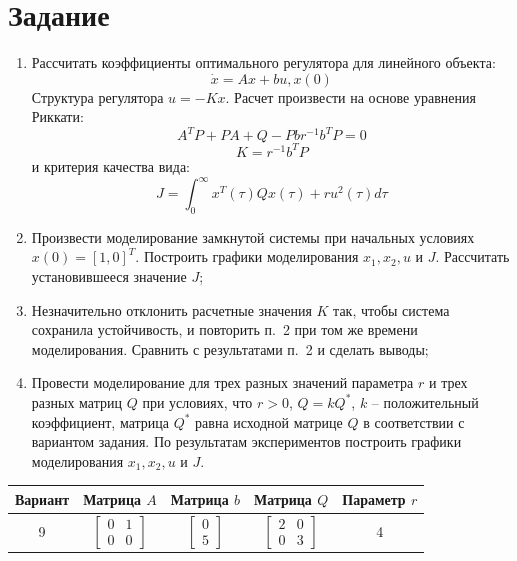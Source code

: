 \documentclass[14pt, a4paper]{extarticle}
\begin{document}
	\onehalfspacing
	
	\setcounter{page}{2}
	
	\section*{Задание}
	
	\begin{enumerate}
		\item Рассчитать коэффициенты оптимального регулятора для линейного объекта:
		$$\dot{x}=Ax+bu, x(0)$$
		Структура регулятора $u=-Kx$. Расчет произвести на основе уравнения Риккати:
		$$A^TP+PA+Q-Pbr^{-1}b^TP=0$$
		$$K=r^{-1}b^TP$$
		и критерия качества вида:
		$$J=\int_{0}^{\infty}x^T(\tau)Qx(\tau)+ru^2(\tau)d\tau$$
		\item Произвести моделирование замкнутой системы при начальных условиях $x(0)=[1,0]^T$. Построить графики моделирования $x_1,x_2,u$ и $J$. Рассчитать установившееся значение $J$;
		\item Незначительно отклонить расчетные значения $K$ так, чтобы система сохранила устойчивость, и повторить п.~2 при том же времени моделирования. Сравнить с результатами п.~2 и сделать выводы;
		\item Провести моделирование для трех разных значений параметра $r$ и трех разных матриц $Q$ при условиях, что $r>0$, $Q=kQ^*$, $k$ -- положительный коэффициент, матрица $Q^*$ равна исходной матрице $Q$ в соответствии с вариантом задания. По результатам экспериментов построить графики моделирования $x_1,x_2,u$ и $J$.
	\end{enumerate}
	\begin{table}[h]
		\centering
		\begin{tabular}{|c|c|c|c|c|}
			\hline
			Вариант & Матрица $A$ & Матрица $b$ & Матрица $Q$ & Параметр $r$ \\\hline
			9 & 
			$\left[
			\begin{matrix}
				0 & 1 \\
				0 & 0 
			\end{matrix}
			\right]$
			& 
			$\left[
			\begin{matrix}
				0 \\ 5
			\end{matrix}
			\right]$
			& 
			$\left[
			\begin{matrix}
				2 & 0 \\
				0 & 3 
			\end{matrix}
			\right]$
			& 4 \\\hline
		\end{tabular}
	\end{table}
	
\end{document}
